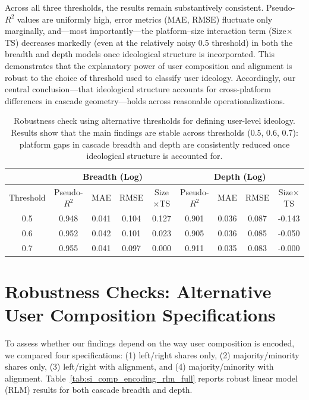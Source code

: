 \documentclass[letterpaper]{article} %
\begin{document}
Across all three thresholds, the results remain substantively consistent. Pseudo-$R^2$ values are uniformly high, error metrics (MAE, RMSE) fluctuate only marginally, and—most importantly—the platform–size interaction term (Size$\times$TS) decreases markedly (even at the relatively noisy 0.5 threshold) in both the breadth and depth models once ideological structure is incorporated. This demonstrates that the explanatory power of user composition and alignment is robust to the choice of threshold used to classify user ideology. Accordingly, our central conclusion—that ideological structure accounts for cross-platform differences in cascade geometry—holds across reasonable operationalizations.
\begin{table}[htbp]
\centering
\caption{Robustness check using alternative thresholds for defining user-level ideology.
Results show that the main findings are stable across thresholds (0.5, 0.6, 0.7): 
platform gaps in cascade breadth and depth are consistently reduced once ideological structure is accounted for.}
\label{tab:robust_threshold}
\begin{tabular}{ccccc|cccc}
\hline
 & \multicolumn{4}{c}{Breadth (Log)} & \multicolumn{4}{c}{Depth (Log)} \\
\hline
 Threshold& Pseudo-$R^2$ & MAE & RMSE & Size$\times$TS  & Pseudo-$R^2$ & MAE & RMSE & Size$\times$TS  \\
\hline
0.5 & 0.948 & 0.041 & 0.104 & 0.127 &  0.901 & 0.036 & 0.087 & -0.143  \\
0.6 & 0.952 & 0.042 & 0.101 & 0.023 & 0.905 & 0.036 & 0.085 & -0.050  \\
0.7 & 0.955 & 0.041 & 0.097 & 0.000 &  0.911 & 0.035 & 0.083 & -0.000  \\
\hline
\end{tabular}
\end{table}


\section*{Robustness Checks: Alternative User Composition Specifications}
To assess whether our findings depend on the way user composition is encoded, we compared four specifications: (1) left/right shares only, (2) majority/minority shares only, (3) left/right with alignment, and (4) majority/minority with alignment. Table~\ref{tab:si_comp_encoding_rlm_full} reports robust linear model (RLM) results for both cascade breadth and depth.
\end{document}
